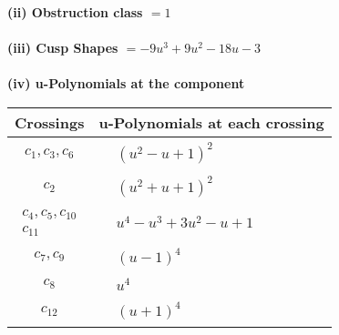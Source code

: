 \documentclass[1p]{elsarticle_modified}
\theoremstyle{definition}
\begin{document}
\flushleft \textbf{(ii) Obstruction class $= 1$}\\~\\
\flushleft \textbf{(iii) Cusp Shapes $= -9 u^3+9 u^2-18 u-3$}\\~\\
\newpage\renewcommand{\arraystretch}{1}
\flushleft \textbf{(iv) u-Polynomials at the component}\newline \\
\begin{tabular}{m{50pt}|m{274pt}}
Crossings & \hspace{64pt}u-Polynomials at each crossing \\
\hline $$\begin{aligned}c_{1},c_{3},c_{6}\end{aligned}$$&$\begin{aligned}
&(u^2- u+1)^2
\end{aligned}$\\
\hline $$\begin{aligned}c_{2}\end{aligned}$$&$\begin{aligned}
&(u^2+u+1)^2
\end{aligned}$\\
\hline $$\begin{aligned}c_{4},c_{5},c_{10}\\c_{11}\end{aligned}$$&$\begin{aligned}
&u^4- u^3+3 u^2- u+1
\end{aligned}$\\
\hline $$\begin{aligned}c_{7},c_{9}\end{aligned}$$&$\begin{aligned}
&(u-1)^4
\end{aligned}$\\
\hline $$\begin{aligned}c_{8}\end{aligned}$$&$\begin{aligned}
&u^4
\end{aligned}$\\
\hline $$\begin{aligned}c_{12}\end{aligned}$$&$\begin{aligned}
&(u+1)^4
\end{aligned}$\\
\hline
\end{tabular}\\~\\
\end{document}
